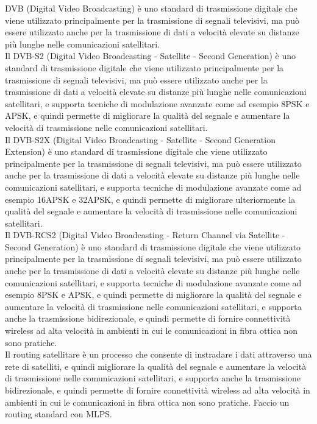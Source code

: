 DVB (Digital Video Broadcasting) è uno standard di trasmissione digitale che viene utilizzato principalmente per la trasmissione di segnali televisivi, ma può essere utilizzato anche per la trasmissione di dati a velocità elevate su distanze più lunghe nelle comunicazioni satellitari.\\
Il DVB-S2 (Digital Video Broadcasting - Satellite - Second Generation) è uno standard di trasmissione digitale che viene utilizzato principalmente per la trasmissione di segnali televisivi, ma può essere utilizzato anche per la trasmissione di dati a velocità elevate su distanze più lunghe nelle comunicazioni satellitari, e supporta tecniche di modulazione avanzate come ad esempio 8PSK e APSK, e quindi permette di migliorare la qualità del segnale e aumentare la velocità di trasmissione nelle comunicazioni satellitari.\\
Il DVB-S2X (Digital Video Broadcasting - Satellite - Second Generation Extension) è uno standard di trasmissione digitale che viene utilizzato principalmente per la trasmissione di segnali televisivi, ma può essere utilizzato anche per la trasmissione di dati a velocità elevate su distanze più lunghe nelle comunicazioni satellitari, e supporta tecniche di modulazione avanzate come ad esempio 16APSK e 32APSK, e quindi permette di migliorare ulteriormente la qualità del segnale e aumentare la velocità di trasmissione nelle comunicazioni satellitari.\\
Il DVB-RCS2 (Digital Video Broadcasting - Return Channel via Satellite - Second Generation) è uno standard di trasmissione digitale che viene utilizzato principalmente per la trasmissione di segnali televisivi, ma può essere utilizzato anche per la trasmissione di dati a velocità elevate su distanze più lunghe nelle comunicazioni satellitari, e supporta tecniche di modulazione avanzate come ad esempio 8PSK e APSK, e quindi permette di migliorare la qualità del segnale e aumentare la velocità di trasmissione nelle comunicazioni satellitari, e supporta anche la trasmissione bidirezionale, e quindi permette di fornire connettività wireless ad alta velocità in ambienti in cui le comunicazioni in fibra ottica non sono pratiche.\\

Il routing satellitare è un processo che consente di instradare i dati attraverso una rete di satelliti, e quindi migliorare la qualità del segnale e aumentare la velocità di trasmissione nelle comunicazioni satellitari, e supporta anche la trasmissione bidirezionale, e quindi permette di fornire connettività wireless ad alta velocità in ambienti in cui le comunicazioni in fibra ottica non sono pratiche. Faccio un routing standard con MLPS.\\
